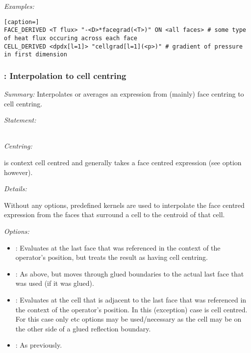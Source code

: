 \emph{Examples:}

\begin{lstlisting}[caption=]
FACE_DERIVED <T flux> "-<D>*facegrad(<T>)" ON <all faces> # some type of heat flux occuring across each face
CELL_DERIVED <dpdx[l=1]> "cellgrad[l=1](<p>)" # gradient of pressure in first dimension
\end{lstlisting}

\subsubsection{: Interpolation to cell centring}


\emph{Summary:} Interpolates or averages an expression from (mainly) face centring to cell centring.

\emph{Statement:}

 \\

\emph{Centring:}

 is context cell centred and generally takes a face centred expression (see  option however).

\emph{Details:}

Without any options, predefined kernels are used to interpolate the face centred expression from the faces that surround a cell to the centroid of that cell.

\emph{Options:}
%
\begin{itemize}
\item {}:  Evaluates  at the last face that was referenced in the context of the operator's position, but treats the result as having cell centring.
\item {}:  As above, but moves through glued boundaries to the actual last face that was used (if it was glued).
\item {}:  Evaluates  at the cell that is adjacent to the last face that was referenced in the context of the operator's position.  In this (exception) case  is cell centred.  For this case only  etc options may be used/necessary as the cell may be on the other side of a glued reflection boundary.
\item {}:  As previously.

\end{itemize}

